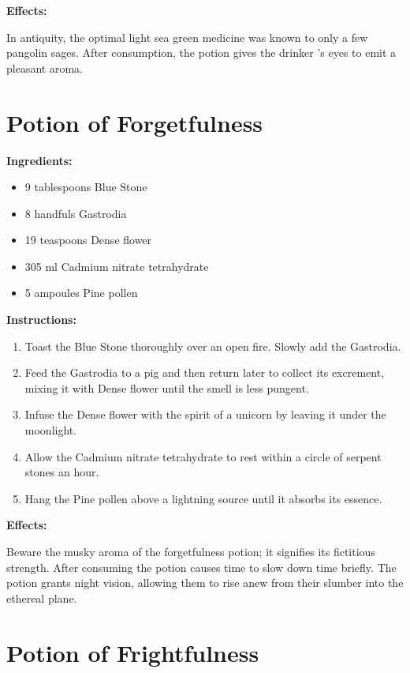 \documentclass{article}
\begin{document}
\textbf{Effects:}

In antiquity, the optimal light sea green medicine was known to only a few pangolin sages. After consumption, the potion gives the drinker 's eyes to emit a pleasant aroma.

\newpage
\section*{Potion of Forgetfulness}

\textbf{Ingredients:}

\begin{itemize}
  \item 9 tablespoons Blue Stone
  \item 8 handfuls Gastrodia
  \item 19 teaspoons Dense flower
  \item 305 ml Cadmium nitrate tetrahydrate
  \item 5 ampoules Pine pollen
\end{itemize}

\textbf{Instructions:}

\begin{enumerate}
  \item Toast the Blue Stone thoroughly over an open fire. Slowly add the Gastrodia.
  \item Feed the Gastrodia to a pig and then return later to collect its excrement, mixing it with Dense flower until the smell is less pungent.
  \item Infuse the Dense flower with the spirit of a unicorn by leaving it under the moonlight.
  \item Allow the Cadmium nitrate tetrahydrate to rest within a circle of serpent stones an hour.
  \item Hang the Pine pollen above a lightning source until it absorbs its essence.
\end{enumerate}

\textbf{Effects:}

Beware the musky aroma of the forgetfulness potion; it signifies its fictitious strength. After consuming the potion causes time to slow down time briefly. The potion grants night vision, allowing them to rise anew from their slumber into the ethereal plane.

\newpage
\section*{Potion of Frightfulness}
\end{document}
